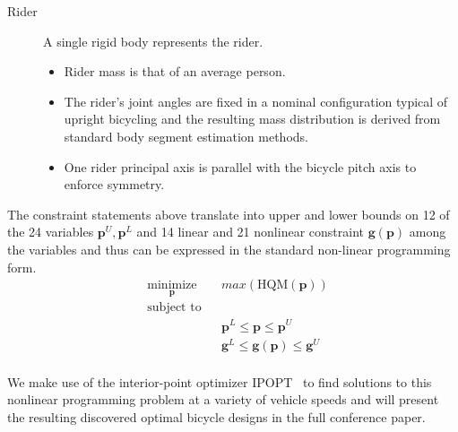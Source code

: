 \documentclass{bmd2019a}
\begin{document}
\begin{description}
  \item[Rider] A single rigid body represents the rider.
    \begin{itemize}
      \itemsep0em
      \item Rider mass is that of an average person.
      \item The rider's joint angles are fixed in a nominal configuration
        typical of upright bicycling and the resulting mass distribution is
        derived from standard body segment estimation methods.
      \item One rider principal axis is parallel with the bicycle pitch axis to
        enforce symmetry.
    \end{itemize}

\end{description}

The constraint statements above translate into upper and lower bounds on 12 of
the 24 variables $\mathbf{p}^U,\mathbf{p}^L$ and 14 linear and 21 nonlinear
constraint $\mathbf{g}(\mathbf{p})$ among the variables and thus can be
expressed in the standard non-linear programming form.
%
\begin{equation}
  \begin{aligned}
    & \underset{\mathbf{p}}{\text{minimize}} & & max(\textrm{HQM}(\mathbf{p})) \\
    & \text{subject to} & & \\
    & & & \mathbf{p}^L \leq \mathbf{p} \leq \mathbf{p}^U \\
    & & & \mathbf{g}^L \leq \mathbf{g}(\mathbf{p}) \leq \mathbf{g}^U \\
  \end{aligned}
\end{equation}

We make use of the interior-point optimizer IPOPT~\cite{Wachter2006} to find
solutions to this nonlinear programming problem at a variety of vehicle speeds
and will present the resulting discovered optimal bicycle designs in the full
conference paper.



\end{document}
